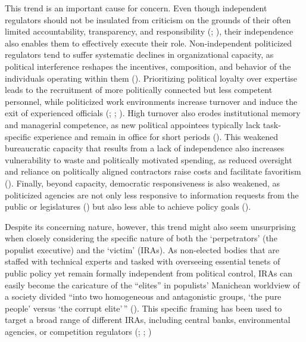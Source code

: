 \documentclass[
  11pt,
  letterpaper,
  DIV=11,
  numbers=noendperiod]{scrartcl}
\begin{document}
This trend is an important cause for concern. Even though independent
regulators should not be insulated from criticism on the grounds of
their often limited accountability, transparency, and responsibility
(;
), their independence also
enables them to effectively execute their role. Non-independent
politicized regulators tend to suffer systematic declines in
organizational capacity, as political interference reshapes the
incentives, composition, and behavior of the individuals operating
within them ().
Prioritizing political loyalty over expertise leads to the recruitment
of more politically connected but less competent personnel, while
politicized work environments increase turnover and induce the exit of
experienced officials (; ;
). High turnover also erodes institutional
memory and managerial competence, as new political appointees typically
lack task-specific experience and remain in office for short periods
(). This weakened
bureaucratic capacity that results from a lack of independence also
increases vulnerability to waste and politically motivated spending, as
reduced oversight and reliance on politically aligned contractors raise
costs and facilitate favoritism (). Finally, beyond capacity, democratic
responsiveness is also weakened, as politicized agencies are not only
less responsive to information requests from the public or legislatures
() but also less able to
achieve policy goals ().

Despite its concerning nature, however, this trend might also seem
unsurprising when closely considering the specific nature of both the
`perpetrators' (the populist executive) and the `victim' (IRAs). As
non-elected bodies that are staffed with technical experts and tasked
with overseeing essential tenets of public policy yet remain formally
independent from political control, IRAs can easily become the
caricature of the ``elites'' in populists' Manichean worldview of a
society divided ``into two homogeneous and antagonistic groups, `the
pure people' versus `the corrupt elite'\,''
(). This specific framing has
been used to target a broad range of different IRAs, including central
banks, environmental agencies, or competition regulators
(;
;
)
\end{document}
